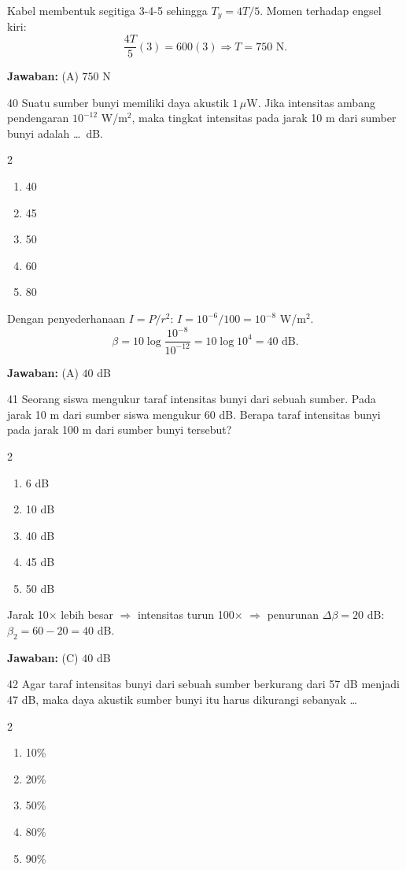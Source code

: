 \documentclass[11pt]{article}
\newenvironment{pilB}{%
  \par\smallskip\begin{multicols}{2}
  \begin{enumerate}[label=(\Alph*),leftmargin=*,itemsep=1pt,topsep=3pt]}%
  {\end{enumerate}\end{multicols}}
\newcommand{\jawaban}[1]{%
  \noindent\colorbox{gold!30}{\parbox{\dimexpr\linewidth-2\fboxsep\relax}{%
    \textbf{Jawaban:} #1}}\par\smallskip}
\begin{document}
\begin{pembox}
Kabel membentuk segitiga 3-4-5 sehingga $T_y=4T/5$. Momen terhadap engsel kiri:
\[\frac{4T}{5}(3)=600(3)\Rightarrow T=750\text{ N.}\]
\jawaban{(A) $750$ N}
\end{pembox}

\begin{soal}{40}
Suatu sumber bunyi memiliki daya akustik $1\,\mu$W. Jika intensitas
ambang pendengaran $10^{-12}$ W/m$^2$, maka tingkat intensitas pada
jarak 10 m dari sumber bunyi adalah \ldots\ dB.
\begin{pilB}
  \item 40 \item 45 \item 50 \item 60 \item 80
\end{pilB}
\end{soal}

\begin{pembox}
Dengan penyederhanaan $I=P/r^2$: $I=10^{-6}/100=10^{-8}$ W/m$^2$.
\[\beta=10\log\frac{10^{-8}}{10^{-12}}=10\log10^4=40\text{ dB.}\]
\jawaban{(A) $40$ dB}
\end{pembox}

\begin{soal}{41}
Seorang siswa mengukur taraf intensitas bunyi dari sebuah sumber. Pada
jarak 10 m dari sumber siswa mengukur 60 dB. Berapa taraf intensitas
bunyi pada jarak 100 m dari sumber bunyi tersebut?
\begin{pilB}
  \item 6 dB \item 10 dB \item 40 dB \item 45 dB \item 50 dB
\end{pilB}
\end{soal}

\begin{pembox}
Jarak 10$\times$ lebih besar $\Rightarrow$ intensitas turun 100$\times$ $\Rightarrow$ penurunan $\Delta\beta=20$ dB: $\beta_2=60-20=40$ dB.
\jawaban{(C) $40$ dB}
\end{pembox}

\begin{soal}{42}
Agar taraf intensitas bunyi dari sebuah sumber berkurang dari 57 dB
menjadi 47 dB, maka daya akustik sumber bunyi itu harus dikurangi
sebanyak \ldots
\begin{pilB}
  \item 10\% \item 20\% \item 50\% \item 80\% \item 90\%
\end{pilB}
\end{soal}
\end{document}

